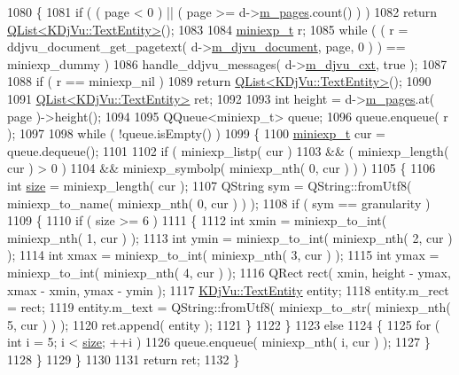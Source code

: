 \begin{DoxyCode}
1080 \{
1081     \textcolor{keywordflow}{if} ( ( page < 0 ) || ( page >= d->\hyperlink{classKDjVu_1_1Private_a0c009b87dde95717ec9e9a8f701e6628}{m\_pages}.count() ) )
1082         \textcolor{keywordflow}{return} \hyperlink{classQList}{QList<KDjVu::TextEntity>}();
1083 
1084     \hyperlink{kdjvu_8h_a58955b1a7edfc6e6ccb48402f744802b}{miniexp\_t} r;
1085     \textcolor{keywordflow}{while} ( ( r = ddjvu\_document\_get\_pagetext( d->\hyperlink{classKDjVu_1_1Private_a183f9508738c71bb5abab150619a5ccd}{m\_djvu\_document}, page, 0 ) ) == 
      miniexp\_dummy )
1086         handle\_ddjvu\_messages( d->\hyperlink{classKDjVu_1_1Private_a5a52150a7ab9bbd584d6d73d68ae9ba1}{m\_djvu\_cxt}, \textcolor{keyword}{true} );
1087 
1088     \textcolor{keywordflow}{if} ( r == miniexp\_nil )
1089         \textcolor{keywordflow}{return} \hyperlink{classQList}{QList<KDjVu::TextEntity>}();
1090 
1091     \hyperlink{classQList}{QList<KDjVu::TextEntity>} ret;
1092 
1093     \textcolor{keywordtype}{int} height = d->\hyperlink{classKDjVu_1_1Private_a0c009b87dde95717ec9e9a8f701e6628}{m\_pages}.at( page )->height();
1094 
1095     QQueue<miniexp\_t> queue;
1096     queue.enqueue( r );
1097 
1098     \textcolor{keywordflow}{while} ( !queue.isEmpty() )
1099     \{
1100         \hyperlink{kdjvu_8h_a58955b1a7edfc6e6ccb48402f744802b}{miniexp\_t} cur = queue.dequeue();
1101 
1102         \textcolor{keywordflow}{if} ( miniexp\_listp( cur )
1103              && ( miniexp\_length( cur ) > 0 )
1104              && miniexp\_symbolp( miniexp\_nth( 0, cur ) ) )
1105         \{
1106             \textcolor{keywordtype}{int} \hyperlink{synctex__parser_8c_aa23c661441688350614bd6a350d2b6ff}{size} = miniexp\_length( cur );
1107             QString sym = QString::fromUtf8( miniexp\_to\_name( miniexp\_nth( 0, cur ) ) );
1108             \textcolor{keywordflow}{if} ( sym == granularity )
1109             \{
1110                 \textcolor{keywordflow}{if} ( size >= 6 )
1111                 \{
1112                     \textcolor{keywordtype}{int} xmin = miniexp\_to\_int( miniexp\_nth( 1, cur ) );
1113                     \textcolor{keywordtype}{int} ymin = miniexp\_to\_int( miniexp\_nth( 2, cur ) );
1114                     \textcolor{keywordtype}{int} xmax = miniexp\_to\_int( miniexp\_nth( 3, cur ) );
1115                     \textcolor{keywordtype}{int} ymax = miniexp\_to\_int( miniexp\_nth( 4, cur ) );
1116                     QRect rect( xmin, height - ymax, xmax - xmin, ymax - ymin );
1117                     \hyperlink{classKDjVu_1_1TextEntity}{KDjVu::TextEntity} entity;
1118                     entity.m\_rect = rect;
1119                     entity.m\_text = QString::fromUtf8( miniexp\_to\_str( miniexp\_nth( 5, cur ) ) );
1120                     ret.append( entity );
1121                 \}
1122             \}
1123             \textcolor{keywordflow}{else}
1124             \{
1125                 \textcolor{keywordflow}{for} ( \textcolor{keywordtype}{int} i = 5; i < \hyperlink{synctex__parser_8c_aa23c661441688350614bd6a350d2b6ff}{size}; ++i )
1126                     queue.enqueue( miniexp\_nth( i, cur ) );
1127             \}
1128         \}
1129     \}
1130 
1131     \textcolor{keywordflow}{return} ret;
1132 \}
\end{DoxyCode}


